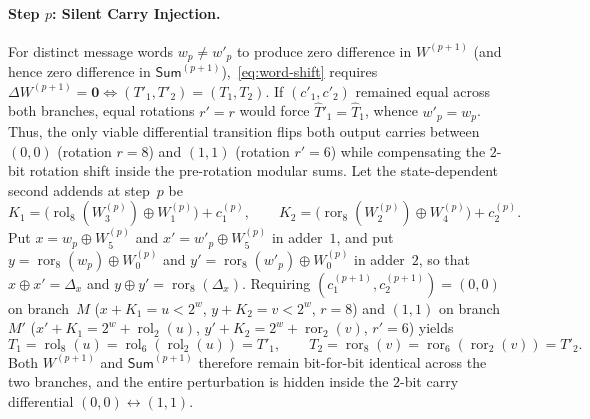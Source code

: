 \documentclass[11pt,a4paper]{article}
\theoremstyle{definition}
\theoremstyle{remark}
\newcommand{\ror}{\operatorname{ror}}
\newcommand{\rol}{\operatorname{rol}}
\newcommand{\SumAcc}{\mathsf{Sum}}
\begin{document}
\paragraph{Step $p$: Silent Carry Injection.}
For distinct message words $w_p \neq w'_p$ to produce zero difference in $W^{(p+1)}$ (and hence zero difference in $\SumAcc^{(p+1)}$),~\eqref{eq:word-shift} requires $\Delta W^{(p+1)} = \mathbf{0} \iff (T'_1, T'_2) = (T_1, T_2)$. If $(c'_1, c'_2)$ remained equal across both branches, equal rotations $r' = r$ would force $\hat{T}'_1 = \hat{T}_1$, whence $w'_p = w_p$. Thus, the only viable differential transition flips both output carries between $(0, 0)$ (rotation $r = 8$) and $(1, 1)$ (rotation $r' = 6$) while compensating the $2$-bit rotation shift inside the pre-rotation modular sums. Let the state-dependent second addends at step~$p$ be
\[
    K_1 = \bigl(\rol_8(W^{(p)}_3) \oplus W^{(p)}_1\bigr) + c_1^{(p)}, \qquad
    K_2 = \bigl(\ror_8(W^{(p)}_2) \oplus W^{(p)}_4\bigr) + c_2^{(p)}.
\]
Put $x = w_p \oplus W^{(p)}_5$ and $x' = w'_p \oplus W^{(p)}_5$ in adder~$1$, and put $y = \ror_8(w_p) \oplus W^{(p)}_0$ and $y' = \ror_8(w'_p) \oplus W^{(p)}_0$ in adder~$2$, so that $x \oplus x' = \Delta_x$ and $y \oplus y' = \ror_8(\Delta_x)$. Requiring $(c^{(p+1)}_1, c^{(p+1)}_2) = (0,0)$ on branch~$M$ ($x + K_1 = u < 2^w$, $y + K_2 = v < 2^w$, $r = 8$) and $(1, 1)$ on branch~$M'$ ($x' + K_1 = 2^w + \rol_2(u)$, $y' + K_2 = 2^w + \ror_2(v)$, $r' = 6$) yields
\[
    T_1 = \rol_8(u) = \rol_6(\rol_2(u)) = T'_1, \qquad
    T_2 = \ror_8(v) = \ror_6(\ror_2(v)) = T'_2.
\]
Both $W^{(p+1)}$ and $\SumAcc^{(p+1)}$ therefore remain bit-for-bit identical across the two branches, and the entire perturbation is hidden inside the $2$-bit carry differential $(0,0) \leftrightarrow (1,1)$.
\end{document}
